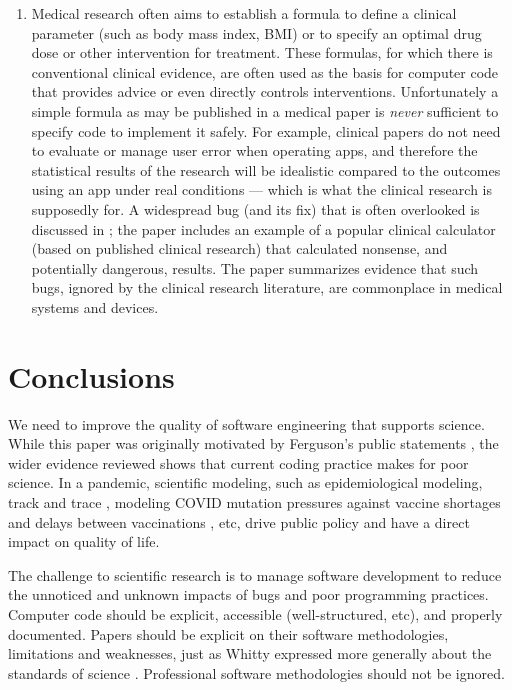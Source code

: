 \begin{enumerate}
\item
Medical research often aims to establish a formula to define a clinical parameter (such as body mass index, BMI) or to specify an optimal drug dose or other intervention for treatment. These formulas, for which there is conventional clinical evidence, are often used as the basis for computer code that provides advice or even directly controls interventions. Unfortunately a simple formula as may be published in a medical paper is \emph{never\/} sufficient to specify code to implement it safely. For example, clinical papers do not need to evaluate or manage user error when operating apps, and therefore the statistical results of the research will be idealistic compared to the outcomes using an app under real conditions --- which is what the clinical research is supposedly for. A widespread bug (and its fix) that is often overlooked is discussed in \cite{numerals}; the paper includes an example of a popular clinical calculator (based on published clinical research) that calculated nonsense, and potentially dangerous, results. The paper \cite{fda} summarizes evidence that such bugs, ignored by the clinical research literature, are commonplace in medical systems and devices.
\end{enumerate}

\section{Conclusions}
We need to improve the quality of software engineering that supports science. While this paper was originally motivated by Ferguson's public statements , the wider evidence reviewed shows that current coding practice makes for poor science. In a pandemic, scientific modeling, such as epidemiological modeling, track and trace \cite{excel-fiasco}, modeling COVID mutation pressures against vaccine shortages and delays between vaccinations \cite{science-delays}, etc, drive public policy and have a direct impact on quality of life.

The challenge to scientific research is to manage software development to reduce the unnoticed and unknown impacts of bugs and poor programming practices. Computer code should be explicit, accessible (well-structured, etc), and properly documented. Papers should be explicit on their software methodologies, limitations and weaknesses, just as Whitty expressed more generally about the standards of science \cite{whitty}. Professional software methodologies should not be ignored.

